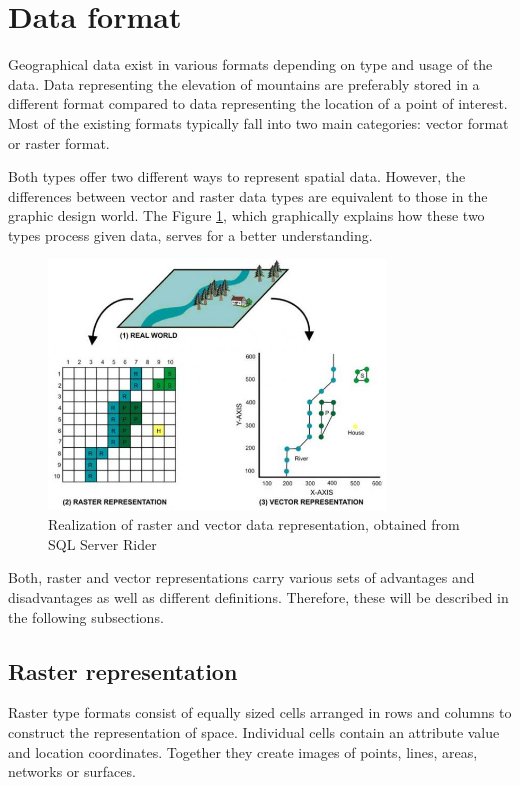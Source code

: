 \documentclass[thesis=M,english]{FITthesis}[2012/10/20]
\begin{document}
\section{Data format}
Geographical data exist in various formats depending on type and usage of the data. Data representing the elevation of mountains are preferably stored in a different format compared to data representing the location of a point of interest. 
Most of the existing formats typically fall into two main categories: vector format or raster format. 

Both types offer two different ways to represent spatial data. However, the differences between vector and raster data types are equivalent to those in the graphic design world. The Figure \ref{pic:RasterVector}, which graphically explains how these two types process given data, serves for a better understanding.

\begin{figure}[h]
\centering
\includegraphics[width=0.8\textwidth]{pics/RasterVectorPreview}
\caption{Realization of raster and vector data representation, obtained from SQL Server Rider \cite{SQL13}}
\label{pic:RasterVector}
\end{figure}

Both, raster and vector representations carry various sets of advantages and disadvantages as well as different definitions. Therefore, these will be described in the following subsections.

\subsection{Raster representation}
Raster type formats consist of equally sized cells arranged in rows and columns to construct the representation of space. Individual cells contain an attribute value and location coordinates. Together they create images of points, lines, areas, networks or surfaces.
\end{document}
